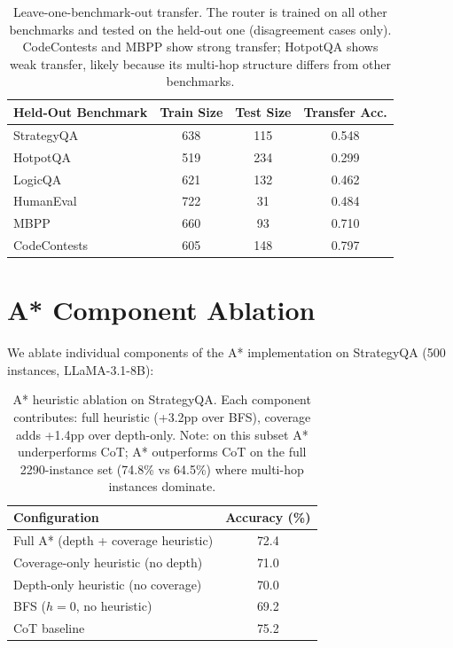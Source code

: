 \documentclass[11pt]{article}
\begin{document}
{\begin{table}[ht]
\centering
\small
\begin{tabular}{lccc}
\toprule
\textbf{Held-Out Benchmark} & \textbf{Train Size} & \textbf{Test Size} & \textbf{Transfer Acc.} \\
\midrule
StrategyQA & 638 & 115 & 0.548 \\
HotpotQA & 519 & 234 & 0.299 \\
LogicQA & 621 & 132 & 0.462 \\
HumanEval & 722 & 31 & 0.484 \\
MBPP & 660 & 93 & 0.710 \\
CodeContests & 605 & 148 & 0.797 \\
\bottomrule
\end{tabular}
\caption{Leave-one-benchmark-out transfer. The router is trained on all other benchmarks and tested on the held-out one (disagreement cases only). CodeContests and MBPP show strong transfer; HotpotQA shows weak transfer, likely because its multi-hop structure differs from other benchmarks.}
\label{tab:leave_one_out}
\end{table}

\section{A* Component Ablation}
\label{app:component_ablation}

We ablate individual components of the A* implementation on StrategyQA (500 instances, LLaMA-3.1-8B):

\begin{table}[ht]
\centering
\small
\begin{tabular}{lc}
\toprule
\textbf{Configuration} & \textbf{Accuracy (\%)} \\
\midrule
Full A* (depth + coverage heuristic) & 72.4 \\
Coverage-only heuristic (no depth) & 71.0 \\
Depth-only heuristic (no coverage) & 70.0 \\
BFS ($h=0$, no heuristic) & 69.2 \\
\midrule
CoT baseline & 75.2 \\
\bottomrule
\end{tabular}
\caption{A* heuristic ablation on StrategyQA. Each component contributes: full heuristic (+3.2pp over BFS), coverage adds +1.4pp over depth-only. Note: on this subset A* underperforms CoT; A* outperforms CoT on the full 2290-instance set (74.8\% vs 64.5\%) where multi-hop instances dominate.}
\label{tab:heuristic_ablation}
\end{table}

}
\end{document}
